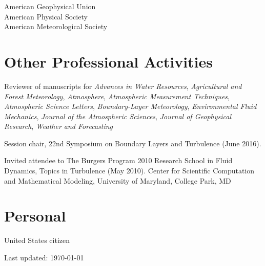 \documentclass[11pt,letterpaper]{article}
\begin{document}
American Geophysical Union \\
American Physical Society \\
American Meteorological Society 


\section*{Other Professional Activities} 

Reviewer of manuscripts for \textit{Advances in Water Resources},
\textit{Agricultural and Forest Meteorology},
\textit{Atmosphere},
\textit{Atmospheric Measurement Techniques},
\textit{Atmospheric Science Letters}, \textit{Boundary-Layer Meteorology},
\textit{Environmental Fluid Mechanics}, \textit{Journal of the Atmospheric
  Sciences}, \textit{Journal of Geophysical Research}, \textit{Weather and Forecasting} 

Session chair, 22nd Symposium on Boundary Layers and Turbulence (June 2016).

Invited attendee to The Burgers Program 2010 Research School in Fluid Dynamics, Topics in Turbulence (May 2010). 
Center for Scientific Computation and Mathematical Modeling, University of Maryland, College Park, MD 

\section*{Personal} 
United States citizen

\bigskip
{\small Last updated: \today}
\end{document}
